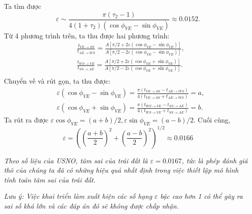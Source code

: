 \begin{enumerate}[label=\textbf{\arabic*,}]
\begin{enumerate}[label=\textbf{\alph*,}]
        Ta tìm được
        \begin{equation} \label{eq16_Earth_eccentricity}
            \varepsilon \sim \frac{\pi\left(\tau_{2}-1\right)}{4\left(1+\tau_{2}\right)\left(\cos \phi_{V E}-\sin \phi_{V E}\right)} \approx 0.0152.
        \end{equation}
        Từ 4 phương trình trên, ta thu được hai phương trình: 
        \begin{align}
            & \frac{t_{V E \rightarrow S S}}{t_{A E \rightarrow W S}} = \frac{A\left[\pi / 2+2 \varepsilon\left(\cos \phi_{V E}-\sin \phi_{V E}\right)\right]}{A\left[\pi / 2-2 \varepsilon\left(\cos \phi_{V E}-\sin \phi_{V E}\right)\right]}, \\
            & \frac{t_{W S \rightarrow V E}}{t_{S S \rightarrow A E}} = \frac{A\left[\pi / 2+2 \varepsilon\left(\cos \phi_{V E}+\sin \phi_{V E}\right)\right]}{A\left[\pi / 2-2 \varepsilon\left(\cos \phi_{V E}+\sin \phi_{V E}\right)\right]}. \\
        \end{align}
        Chuyển vế và rút gọn, ta thu được:
        \begin{align}
             & \varepsilon\left(\cos \phi_{V E}-\sin \phi_{V E}\right) =  \frac{\pi \left(t_{V E \rightarrow S S} -t_{A E \rightarrow W S}\right)}{4\left(t_{V E \rightarrow S S} + t_{A E \rightarrow W S}\right)} = a ,\\
             & \varepsilon\left(\cos \phi_{V E}+\sin \phi_{V E}\right) =  \frac{\pi \left(t_{W S \rightarrow V E} -t_{S S \rightarrow A E}\right)}{4\left(t_{W S \rightarrow V E} + t_{S S \rightarrow A E}\right)} = b.
        \end{align}
        Ta rút ra được $\varepsilon \cos \phi_{V E} = (a+b)/2, \varepsilon \sin \phi_{V E} = (a-b)/2$. Cuối cùng,
        \begin{equation} \label{eq22_Earth_eccentricity}
            \varepsilon = \left(\left(\frac{a+b}{2}\right)^2 + \left(\frac{a-b}{2}\right)^2 \right)^{1/2} \approx 0.0166
        \end{equation}
    \end{enumerate}
\end{enumerate}
\textit{Theo số liệu của USNO, tâm sai của trái đất là $\varepsilon = 0.0167$, tức là phép đánh giá thô của chúng ta đã có những hiệu quả nhất định trong việc thiết lập mô hình tính toán tâm sai của trái đất.}

\textit{Lưu ý: Việc khai triển làm xuất hiện các số hạng $\varepsilon$ bậc cao hơn 1 có thể gây ra sai số khá lớn và các đáp án đó sẽ không được chấp nhận.}

